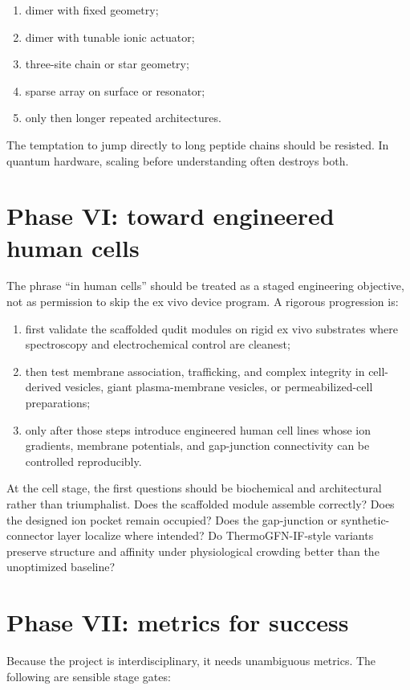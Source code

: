 \documentclass[11pt]{report}
\theoremstyle{definition}
\begin{document}
\begin{enumerate}[leftmargin=2em]
\item dimer with fixed geometry;
\item dimer with tunable ionic actuator;
\item three-site chain or star geometry;
\item sparse array on surface or resonator;
\item only then longer repeated architectures.
\end{enumerate}

The temptation to jump directly to long peptide chains should be resisted. In quantum hardware, scaling before understanding often destroys both.

\section{Phase VI: toward engineered human cells}
The phrase ``in human cells'' should be treated as a staged engineering objective, not as permission to skip the ex vivo device program. A rigorous progression is:

\begin{enumerate}[leftmargin=2em]
\item first validate the scaffolded qudit modules on rigid ex vivo substrates where spectroscopy and electrochemical control are cleanest;
\item then test membrane association, trafficking, and complex integrity in cell-derived vesicles, giant plasma-membrane vesicles, or permeabilized-cell preparations;
\item only after those steps introduce engineered human cell lines whose ion gradients, membrane potentials, and gap-junction connectivity can be controlled reproducibly.
\end{enumerate}

At the cell stage, the first questions should be biochemical and architectural rather than triumphalist. Does the scaffolded module assemble correctly? Does the designed ion pocket remain occupied? Does the gap-junction or synthetic-connector layer localize where intended? Do ThermoGFN-IF-style variants preserve structure and affinity under physiological crowding better than the unoptimized baseline? 

\section{Phase VII: metrics for success}
Because the project is interdisciplinary, it needs unambiguous metrics. The following are sensible stage gates:
\end{document}
